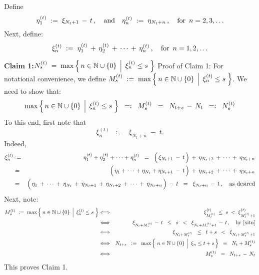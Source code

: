 Define
\begin{equation*}
\eta^{(t)}_{1} \; := \; \xi_{N_{t}+1} \,-\, t\,,
\quad\textnormal{and}\quad
\eta^{(t)}_{n} \; := \; \eta_{N_{t}+n}\,,
\quad\textnormal{for \,$n = 2, 3, \ldots$}
\end{equation*}
Next, define:
\begin{equation*}
\xi^{(t)}_{n} \; := \; \eta^{(t)}_{1} \,+\, \eta^{(t)}_{2} \,+\, \cdots \,+\, \eta^{(t)}_{n}\,,
\quad\textnormal{for \,$n = 1, 2, \ldots$}
\end{equation*}

\vskip 0.5cm
\noindent
\textbf{Claim 1:}\quad $N^{(t)}_{s} \; = \; \max\left\{\,n\in\mathbb{N}\cup\{0\}\;\left\vert\;\,\xi^{(t)}_{n} \leq s\right.\,\right\}$
\vskip 0.2cm
\noindent
Proof of Claim 1:\quad
For notational convenience, we define
$M^{(t)}_{s} \; := \; \max\left\{\,n\in\mathbb{N}\cup\{0\}\;\left\vert\;\,\xi^{(t)}_{n} \leq s\right.\,\right\}$.
We need to show that:
\begin{equation*}
\max\left\{\,n\in\mathbb{N}\cup\{0\}\;\left\vert\;\,\xi^{(t)}_{n} \leq s\right.\,\right\}
\;\; =: \;\;
	M^{(t)}_{s}
\;\; = \;\;
	N_{t+s} \,-\, N_{t}
\;\; =: \;\;
	N^{(t)}_{s}
\end{equation*}
To this end, first note that
\begin{equation}\label{xitn}
\xi^{(t)}_{n} \;\; := \;\; \xi_{N_{t}+n} \;-\; t.
\end{equation}
Indeed,
\begin{eqnarray*}
\xi^{(t)}_{n}
& := &
	\eta^{(t)}_{1} + \eta^{(t)}_{2} + \cdots + \eta^{(t)}_{n}
\;\; = \;\;
	\left(\,\xi_{N_{t}+1} \,\overset{{\color{white}.}}{-}\, t\,\right)
	\, + \,
	\eta_{N_{t}+2}
	\, + \,
	\cdots
	\, + \,
	\eta_{N_{t}+n}
\\
& = &
	\left(\,\eta_{1} + \cdots +  \eta_{N_{t}} +\eta_{N_{t}+1} \,\overset{{\color{white}.}}{-}\, t\,\right)
	\, + \,
	\eta_{N_{t}+2}
	\, + \,
	\cdots
	\, + \,
	\eta_{N_{t}+n}
\\
& = &
	\left(\,\eta_{1} \,\overset{{\color{white}.}}{+}\, \cdots \,+\,  \eta_{N_{t}}
	\,+\, \eta_{N_{t}+1} \,+\, \eta_{N_{t}+2} \,+\, \cdots\,+\, \eta_{N_{t}+n}
	\,\right)
	\, - \,
	t
\;\; = \;\;
	\xi_{N_{t}+n} \,-\, t\,,
	\quad
	\textnormal{as desired}
\end{eqnarray*}
Next, note:
\begin{eqnarray*}
M^{(t)}_{s} \; := \; \max\left\{\,n\in\N\cup\{0\}\;\left\vert\;\,\xi^{(t)}_{n} \leq s\right.\,\right\}
& \Longleftrightarrow &
	\xi^{(t)}_{M^{(t)}_{s}} \;\leq\; s \;<\; \xi^{(t)}_{M^{(t)}_{s}+1}
\\
& \Longleftrightarrow &
	\xi_{N_{t}+M^{(t)}_{s}} \,-\, t \;\;\leq\;\; s \;\;<\;\; \xi_{N_{t}+M^{(t)}_{s}+1} \,-\, t\,,
	\quad
	\textnormal{by \eqref{xitn}}
\\
& \Longleftrightarrow &
	\xi_{N_{t}+M^{(t)}_{s}} \;\;\leq\;\; t + s \;\;<\;\; \xi_{N_{t}+M^{(t)}_{s}+1}
\\
& \Longleftrightarrow &
	N_{t+s}
	\;\; := \;\;
		\max\left\{\,\left.\overset{{\color{white}1}}{n}\in\N\cup\{0\}\,\;\right\vert\;\xi_{n} \leq t+s \,\right\}
	\;\; = \;\;
		N_{t} + M^{(t)}_{s}
\\
& \Longleftrightarrow &
	M^{(t)}_{s}
	\;\; = \;\;
		N_{t+s} \, - \,N_{t}
\end{eqnarray*}
This proves Claim 1.

